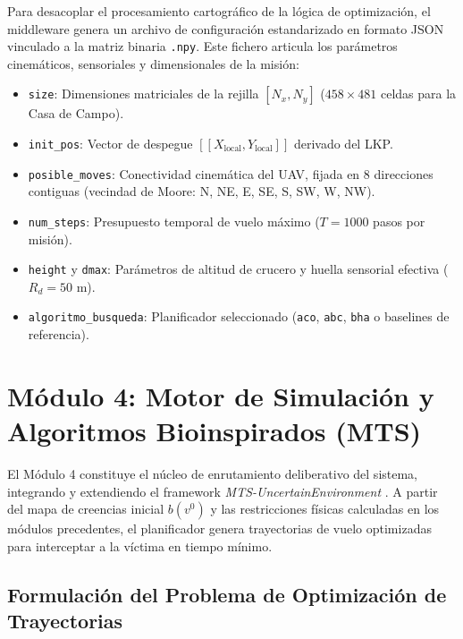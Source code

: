 Para desacoplar el procesamiento cartográfico de la lógica de optimización, el middleware genera un archivo de configuración estandarizado en formato JSON vinculado a la matriz binaria \texttt{.npy}. Este fichero articula los parámetros cinemáticos, sensoriales y dimensionales de la misión:
\begin{itemize}
    \item \texttt{size}: Dimensiones matriciales de la rejilla $[N_x, N_y]$ ($458 \times 481$ celdas para la Casa de Campo).
    \item \texttt{init\_pos}: Vector de despegue $[[X_{\text{local}}, Y_{\text{local}}]]$ derivado del LKP.
    \item \texttt{posible\_moves}: Conectividad cinemática del UAV, fijada en 8 direcciones contiguas (vecindad de Moore: N, NE, E, SE, S, SW, W, NW).
    \item \texttt{num\_steps}: Presupuesto temporal de vuelo máximo ($T = 1000$ pasos por misión).
    \item \texttt{height} y \texttt{dmax}: Parámetros de altitud de crucero y huella sensorial efectiva ($R_d = 50\text{ m}$).
    \item \texttt{algoritmo\_busqueda}: Planificador seleccionado (\texttt{aco}, \texttt{abc}, \texttt{bha} o baselines de referencia).
\end{itemize}

\section{Módulo 4: Motor de Simulación y Algoritmos Bioinspirados (MTS)}

El Módulo 4 constituye el núcleo de enrutamiento deliberativo del sistema, integrando y extendiendo el framework \textit{MTS-UncertainEnvironment} \cite{Broton_Gutierrez_MTS-UncertainEnvironment}. A partir del mapa de creencias inicial $b(v^0)$ y las restricciones físicas calculadas en los módulos precedentes, el planificador genera trayectorias de vuelo optimizadas para interceptar a la víctima en tiempo mínimo.

\subsection{Formulación del Problema de Optimización de Trayectorias}

